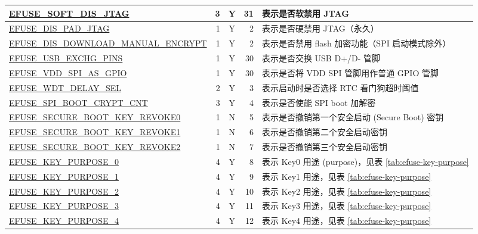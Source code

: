 \begin{longtable}[l]{ |m{8.2cm}|r|c|r|m{9.3cm}| }
    \hline
    \hyperref[fielddesc:EFUSESOFTDISJTAG]{EFUSE\_SOFT\_DIS\_JTAG} & 3 & Y & 31 & 表示是否软禁用 JTAG\\
    \hline
    \hyperref[fielddesc:EFUSEDISPADJTAG]{EFUSE\_DIS\_PAD\_JTAG} & 1 & Y & 2 & 表示是否硬禁用 JTAG（永久） \\
    \hline
    \hyperref[fielddesc:EFUSEDISDOWNLOADMANUALENCRYPT]{EFUSE\_DIS\_DOWNLOAD\_MANUAL\_ENCRYPT} &  1 & Y & 2 & 表示是否禁用 flash 加密功能（SPI 启动模式除外）\\
    \hline
    \hyperref[fielddesc:EFUSEUSBEXCHGPINS]{EFUSE\_USB\_EXCHG\_PINS} & 1 & Y & 30 & 表示是否交换 USB D+/D- 管脚 \\
    \hline
    \hyperref[fielddesc:EFUSEVDDSPIASGPIO]{EFUSE\_VDD\_SPI\_AS\_GPIO} & 1 & Y & 30 & 表示是否将 VDD SPI 管脚用作普通 GPIO 管脚 \\
    \hline
    \hyperref[fielddesc:EFUSEWDTDELAYSEL]{EFUSE\_WDT\_DELAY\_SEL} & 2 & Y & 3 & 表示启动时是否选择 RTC 看门狗超时阈值 \\
    \hline
    \hyperref[fielddesc:EFUSESPIBOOTCRYPTCNT]{EFUSE\_SPI\_BOOT\_CRYPT\_CNT} & 3 & Y & 4 & 表示是否使能 SPI boot 加解密\\
    \hline
    \hyperref[fielddesc:EFUSESECUREBOOTKEYREVOKE0]{EFUSE\_SECURE\_BOOT\_KEY\_REVOKE0} & 1 & N & 5 & 表示是否撤销第一个安全启动 (Secure Boot) 密钥 \\
    \hline
    \hyperref[fielddesc:EFUSESECUREBOOTKEYREVOKE1]{EFUSE\_SECURE\_BOOT\_KEY\_REVOKE1} & 1 & N & 6 & 表示是否撤销第二个安全启动密钥 \\
    \hline
    \hyperref[fielddesc:EFUSESECUREBOOTKEYREVOKE2]{EFUSE\_SECURE\_BOOT\_KEY\_REVOKE2} & 1 & N & 7 & 表示是否撤销第三个安全启动密钥 \\
    \hline
    \hyperref[fielddesc:EFUSEKEYPURPOSE0]{EFUSE\_KEY\_PURPOSE\_0} & 4 & Y & 8 & {表示 Key0 用途 (purpose)，见表 \ref{tab:efuse-key-purpose}} \\
    \hline
    \hyperref[fielddesc:EFUSEKEYPURPOSE1]{EFUSE\_KEY\_PURPOSE\_1} & 4 & Y & 9 & {表示 Key1 用途，见表 \ref{tab:efuse-key-purpose}} \\
    \hline
    \hyperref[fielddesc:EFUSEKEYPURPOSE2]{EFUSE\_KEY\_PURPOSE\_2} & 4 & Y & 10 & {表示 Key2 用途，见表 \ref{tab:efuse-key-purpose}} \\
    \hline
    \hyperref[fielddesc:EFUSEKEYPURPOSE3]{EFUSE\_KEY\_PURPOSE\_3} & 4 & Y & 11 & {表示 Key3 用途，见表 \ref{tab:efuse-key-purpose}} \\
    \hline
    \hyperref[fielddesc:EFUSEKEYPURPOSE4]{EFUSE\_KEY\_PURPOSE\_4} & 4 & Y & 12 & {表示 Key4 用途，见表 \ref{tab:efuse-key-purpose}} \\

\end{longtable}
